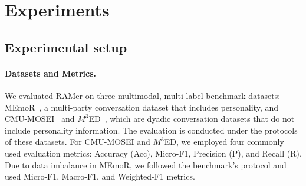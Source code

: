 \section{Experiments}

\subsection{Experimental setup}

\paragraph{Datasets and Metrics.}
We evaluated RAMer on three multimodal, multi-label benchmark datasets: MEmoR~\cite{MEmoR}, a multi-party conversation dataset that includes personality, and CMU-MOSEI~\cite{Cmu-mosei} and $M^3$ED~\cite{M3ED}, which are dyadic conversation datasets that do not include personality information. The evaluation is conducted under the protocols of these datasets. For CMU-MOSEI and $M^3$ED, we employed four commonly used evaluation metrics: Accuracy (Acc), Micro-F1, Precision (P), and Recall (R). Due to data imbalance in MEmoR, we followed the benchmark's protocol and used Micro-F1, Macro-F1, and Weighted-F1 metrics. 


